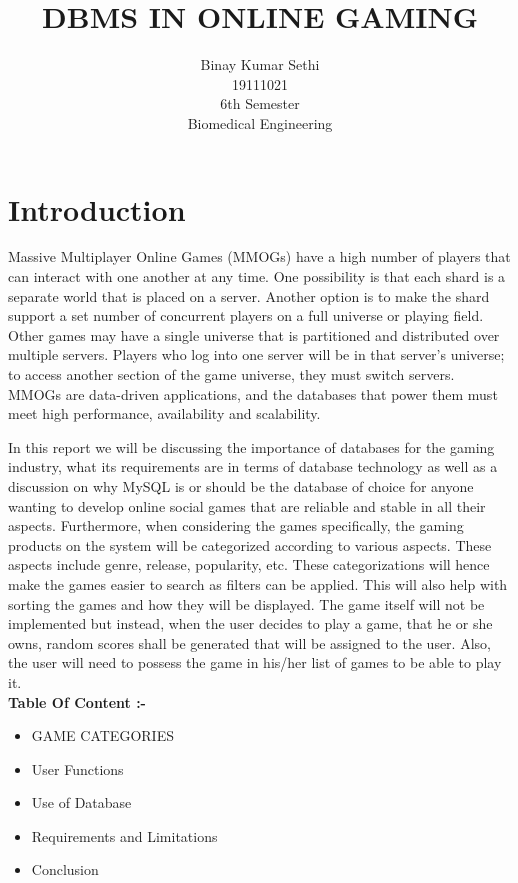 \documentclass{article}
\begin{document}
\title{DBMS IN ONLINE GAMING}


\author{Binay Kumar Sethi \\
	19111021 \\
 	6th Semester \\ 
	Biomedical Engineering\\
	}

\maketitle 
 \hrulefill
 
 
 \section{Introduction}
 
Massive Multiplayer Online Games (MMOGs) have a high number of players that can interact with one another at any time. One possibility is that each shard is a separate world that is placed on a server. Another option is to make the shard support a set number of concurrent players on a full universe or playing field. Other games may have a single universe that is partitioned and distributed over multiple servers. Players who log into one server will be in that server's universe; to access another section of the game universe, they must switch servers.
MMOGs are data-driven applications, and the databases that power them must meet high performance, availability and scalability.

In this report we will be discussing the importance of databases for the gaming industry, what its requirements are in terms of database technology as well as a discussion on why MySQL is or should be the database of choice for anyone wanting to develop online social games that are reliable and stable in all their aspects. Furthermore, when considering the games specifically, the gaming products on the system will be categorized according to various aspects. These aspects include genre, release, popularity, etc. These categorizations will hence make the games easier to search as filters can be applied. This will also help with sorting the games and how they will be displayed. The game itself will not be implemented but instead, when the user decides to play a game, that he or she owns, random scores shall be generated that will be assigned to the user. Also, the user will need to possess the game in his/her list of games to be able to play it.\\
\textbf{Table Of Content :- }
 \begin{itemize}
\item GAME CATEGORIES
\item User Functions
\item Use of Database
\item Requirements and Limitations
\item Conclusion

\end{itemize}
\end{document}
